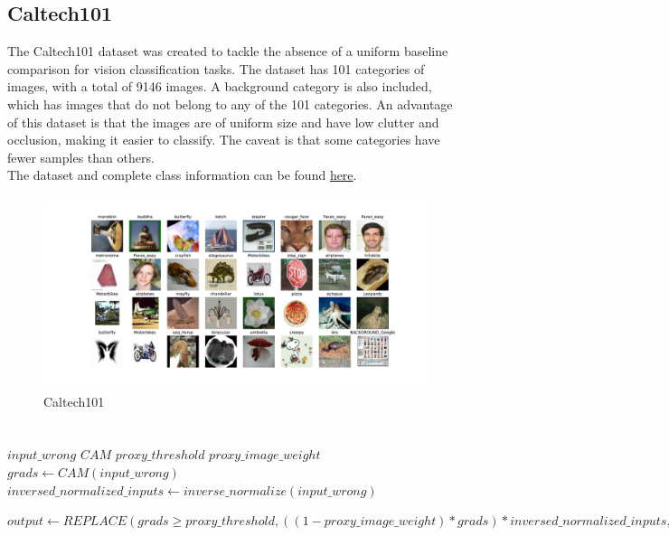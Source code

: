 \subsection{Caltech101}
The Caltech101 \cite{li_andreeto_ranzato_perona_2022} dataset was created to tackle the absence of a uniform baseline comparison for vision classification tasks. The dataset has 101 categories of images, with a total of 9146 images. A background category is also included, which has images that do not belong to any of the 101 categories. An advantage of this dataset is that the images are of uniform size and have low clutter and occlusion, making it easier to classify. The caveat is that some categories have fewer samples than others.\\
The dataset and complete class information can be found \href{https://www.kaggle.com/datasets/862ae86edba271c39f76d0b530edeb55076b4b82b971160637210900747c44b1}{here}.
\begin{figure}[H]
    \centering
    \includegraphics[width=1\textwidth]{images/caltech101.pdf}
    \caption{Caltech101}
    \label{fig:calt}
\end{figure}

\section{}

\begin{algorithm}
    \caption{Single Batch Proxy Attention}
    \label{alg:proxy_attention_single_batch}
    \begin{algorithmic}
        \REQUIRE $input\_wrong$
        \REQUIRE $CAM$
        \REQUIRE $proxy\_threshold$
        \REQUIRE $proxy\_image\_weight$
        \STATE $grads \leftarrow CAM(input\_wrong)$
        \STATE $inversed\_normalized\_inputs \leftarrow inverse\_normalize(input\_wrong)$

        \STATE $output \leftarrow REPLACE(grads \geq proxy\_threshold, ((1- proxy\_image\_weight) * grads) * inversed\_normalized\_inputs, inversed\_normalized\_inputs)$
    \end{algorithmic}
\end{algorithm}


